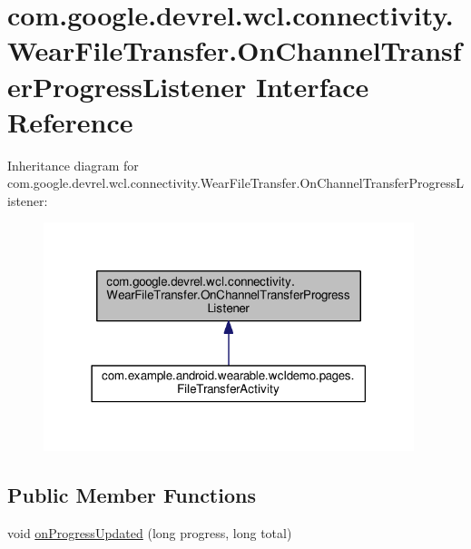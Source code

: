 \hypertarget{interfacecom_1_1google_1_1devrel_1_1wcl_1_1connectivity_1_1WearFileTransfer_1_1OnChannelTransferProgressListener}{}\section{com.\+google.\+devrel.\+wcl.\+connectivity.\+Wear\+File\+Transfer.\+On\+Channel\+Transfer\+Progress\+Listener Interface Reference}
\label{interfacecom_1_1google_1_1devrel_1_1wcl_1_1connectivity_1_1WearFileTransfer_1_1OnChannelTransferProgressListener}


Inheritance diagram for com.\+google.\+devrel.\+wcl.\+connectivity.\+Wear\+File\+Transfer.\+On\+Channel\+Transfer\+Progress\+Listener\+:\nopagebreak
\begin{figure}[H]
\begin{center}
\leavevmode
\includegraphics[width=306pt]{d2/d78/interfacecom_1_1google_1_1devrel_1_1wcl_1_1connectivity_1_1WearFileTransfer_1_1OnChannelTransferee334040cc0a0e341d6828f13224ccb2}
\end{center}
\end{figure}
\subsection*{Public Member Functions}
\begin{DoxyCompactItemize}
\item 
void \hyperlink{interfacecom_1_1google_1_1devrel_1_1wcl_1_1connectivity_1_1WearFileTransfer_1_1OnChannelTransferProgressListener_ac7194a322966748546de79aa32b61f22}{on\+Progress\+Updated} (long progress, long total)
\end{DoxyCompactItemize}


